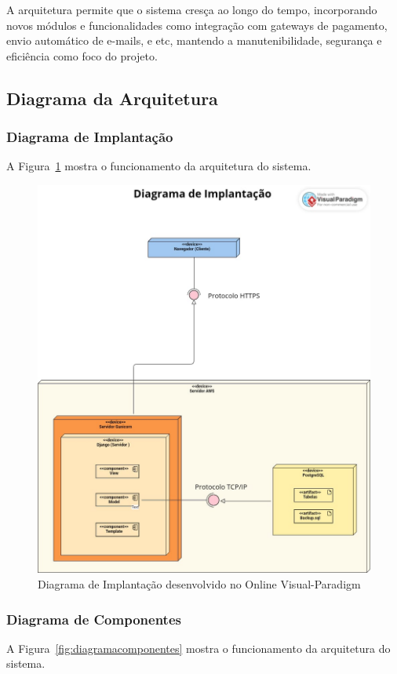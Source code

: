 \documentclass[
	12pt,				%
	openany,			%
	twoside,			%
	a4paper,			%
	english,			%
	french,				%
	spanish,			%
	brazil				%
	]{abntex2}
\begin{document}
A arquitetura permite que o sistema cresça ao longo do tempo, incorporando novos módulos e funcionalidades como integração com gateways de pagamento, envio automático de e-mails, e etc, mantendo a manutenibilidade, segurança e eficiência como foco do projeto.

\subsection{Diagrama da Arquitetura}
\subsubsection{Diagrama de Implantação}
A Figura~\ref{fig:diagramaimplantação} mostra o funcionamento da arquitetura do sistema.

\begin{figure}[H]
	\centering
	\includegraphics[width=\textwidth]{Diagrama de Implantação- Digitalização da Pousada.JPEG}
	\caption{Diagrama de Implantação desenvolvido no Online Visual-Paradigm}
	\label{fig:diagramaimplantação}
\end{figure}
\subsubsection{Diagrama de Componentes}
A Figura~\ref{fig:diagramacomponentes} mostra o funcionamento da arquitetura do sistema.
\end{document}
